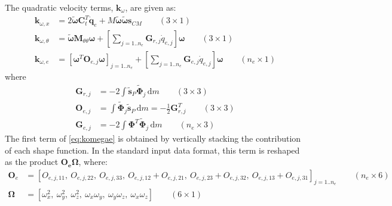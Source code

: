 \documentclass[wes, manuscript]{copernicus}
\renewcommand{\d}{\mathrm{d}}
\renewcommand{\v}[1]{\boldsymbol{#1}}
\newcommand{\m}[1]{\boldsymbol{#1}}
\newcommand{\M} {{\m{M}}}
\newcommand{\stil}  {\m{\tilde{s}}}
\renewcommand{\d}{\mathrm{d}}
\newcommand{\dm}{\d{m}}
\begin{document}
The quadratic velocity terms, $\v{k}_\omega$,  are given as:
\begin{align}
  \v{k}_{\omega, x}       & = 2\v{\tilde{\omega}}  \v{C}_t^T \v{\dot{q}}_e
      + 
M\v{\tilde{\omega}} 
 \v{\tilde{\omega}} 
\v{s}_{CM}
 \qquad (3\times 1)
  \\
  \v{k}_{\omega, \theta}  & = \v{\tilde{\omega}}\M_{\theta\theta}\v{\omega}         
   +\left[\sum\limits_{j=1..n_e}  \v{G}_{r,j} \dot{q}_{e,j}\right] \v{\omega}
 \qquad (3\times 1)
  \\
  \v{k}_{\omega, e}   & =  \left[  \v{\omega}^T \m{O}_{e,j}\v{\omega}\right]_{j=1..n_e} 
  + 
    \left[\sum\limits_{j=1..n_e}   \m{G}_{e,j} \dot{q}_{e,j}\right] \v{\omega}
 \qquad (n_e\times 1)
 \label{eq:komegae}
\end{align}
where
\begin{align}
    \m{G}_{r,j} &=  -2 \int   \stil_P \m{\tilde{\Phi}}_j \,\dm \qquad (3\times 3) 
        \\
    \m{O}_{e,j} &=  \int  \m{\tilde{\Phi}}_j \stil_P\,\dm = -\frac{1}{2}  \m{G}_{r,j}^T  \qquad (3\times 3) 
    \\
    \m{G}_{e,j} &=  -2 \int  \m{\Phi}^T \m{\tilde{\Phi}}_j \,\dm \qquad (n_e\times 3) 
\end{align}
The first term of \autoref{eq:komegae} is obtained by vertically stacking the contribution of each shape function. 
In the standard input data format, this term is reshaped as the product $\m{O_e}\v{\Omega}$, where: 
\begin{align}
  \m{O}_e &= \left[O_{e,j,11},\ O_{e,j,22},\  O_{e,j,33},\ O_{e,j,12}+O_{e,j,21},\ O_{e,j,23}+O_{e,j,32},\ O_{e,j,13}+O_{e,j,31}\right]_{j=1..n_e}  \qquad (n_e\times 6)
       \\
 \v{\Omega} &=  \left[\omega_x^2,\ \omega_y^2,\ \omega_z^2,\ \omega_x \omega_y,\ \omega_y \omega_z,\ \omega_x \omega_z \right] \qquad (6\times 1)
\end{align}
\end{document}
